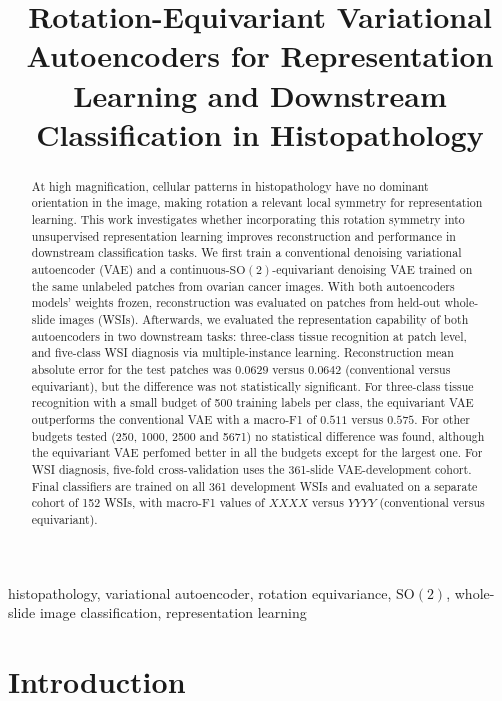 \documentclass{midl}
\title[Rotation-Equivariant VAEs for Histopathology]{Rotation-Equivariant Variational Autoencoders for Representation
Learning and Downstream Classification in Histopathology}
\newcommand{\SOtwo}{\mathrm{SO}(2)}
\begin{document}
\maketitle

\begin{abstract}
At high magnification, cellular patterns in histopathology have no dominant orientation in the image, making rotation a relevant local symmetry for representation learning. This work investigates whether incorporating this rotation symmetry into unsupervised representation learning improves reconstruction and performance in downstream classification tasks. We first train a conventional denoising variational autoencoder (VAE) and a continuous-$\SOtwo$-equivariant denoising VAE trained on the same unlabeled patches from ovarian cancer images. With both autoencoders models' weights frozen, reconstruction was evaluated on patches from held-out whole-slide images (WSIs). Afterwards, we evaluated the representation capability of both autoencoders in two downstream tasks: three-class tissue recognition at patch level, and five-class WSI diagnosis via multiple-instance learning. Reconstruction mean absolute error for the test patches was $0.0629$ versus $0.0642$ (conventional versus equivariant), but the difference was not statistically significant. For three-class tissue recognition with a small budget of 500 training labels per class, the equivariant VAE outperforms the conventional VAE with a macro-F1 of $0.511$ versus $0.575$. For other budgets tested (250, 1000, 2500 and 5671) no statistical difference was found, although the equivariant VAE perfomed better in all the budgets except for the largest one. For WSI diagnosis, five-fold cross-validation uses the 361-slide VAE-development cohort. Final classifiers are trained on all 361 development WSIs and evaluated on a separate cohort of 152 WSIs, with macro-F1 values of $XXXX$ versus $YYYY$ (conventional versus equivariant).
\end{abstract}

\begin{keywords}
histopathology, variational autoencoder, rotation equivariance, $\SOtwo$, whole-slide image classification, representation learning
\end{keywords}

\section{Introduction}
\end{document}
